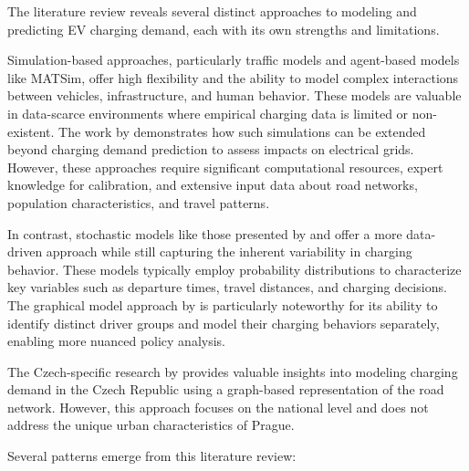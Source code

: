 The literature review reveals several distinct approaches to modeling and predicting EV charging demand, each with its own strengths and limitations.

Simulation-based approaches, particularly traffic models and agent-based models like MATSim, offer high flexibility and the ability to model complex interactions between vehicles, infrastructure, and human behavior. These models are valuable in data-scarce environments where empirical charging data is limited or non-existent. The work by \cite{novoselAgentBasedModelling2015} demonstrates how such simulations can be extended beyond charging demand prediction to assess impacts on electrical grids. However, these approaches require significant computational resources, expert knowledge for calibration, and extensive input data about road networks, population characteristics, and travel patterns.

In contrast, stochastic models like those presented by \cite{bradyModellingChargingProfiles2016} and \cite{ul-haqProbabilisticModelingElectric2018} offer a more data-driven approach while still capturing the inherent variability in charging behavior. These models typically employ probability distributions to characterize key variables such as departure times, travel distances, and charging decisions. The graphical model approach by \cite{powellScalableProbabilisticEstimates2022} is particularly noteworthy for its ability to identify distinct driver groups and model their charging behaviors separately, enabling more nuanced policy analysis.

The Czech-specific research by \cite{pekarekModelChargingService2017} provides valuable insights into modeling charging demand in the Czech Republic using a graph-based representation of the road network. However, this approach focuses on the national level and does not address the unique urban characteristics of Prague.

Several patterns emerge from this literature review:

